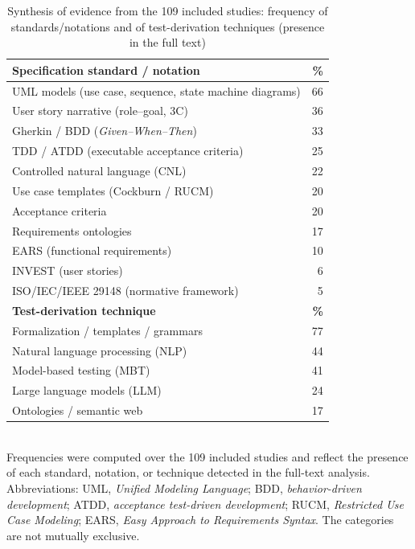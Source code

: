 \documentclass[10pt,journal,twoside,letterpaper]{IEEEtran}
\begin{document}
    \begin{table}[!tb]
        \caption{Synthesis of evidence from the 109 included studies: frequency of standards/notations and of test-derivation techniques (presence in the full text)}
        \label{tab:sintesis}
        \centering
        \small
        \setlength{\tabcolsep}{6pt}
        \begin{tabular}{@{}p{6.9cm}r@{}}
            \toprule
            \textbf{Specification standard / notation} & \textbf{\%} \\
            \midrule
            UML models (use case, sequence, state machine diagrams) & 66 \\
            User story narrative (role--goal, 3C) & 36 \\
            Gherkin / BDD (\emph{Given--When--Then}) & 33 \\
            TDD / ATDD (executable acceptance criteria) & 25 \\
            Controlled natural language (CNL) & 22 \\
            Use case templates (Cockburn / RUCM) & 20 \\
            Acceptance criteria & 20 \\
            Requirements ontologies & 17 \\
            EARS (functional requirements) & 10 \\
            INVEST (user stories) & 6 \\
            ISO/IEC/IEEE 29148 (normative framework) & 5 \\
            \midrule
            \textbf{Test-derivation technique} & \textbf{\%} \\
            \midrule
            Formalization / templates / grammars & 77 \\
            Natural language processing (NLP) & 44 \\
            Model-based testing (MBT) & 41 \\
            Large language models (LLM) & 24 \\
            Ontologies / semantic web & 17 \\
            \bottomrule
        \end{tabular}
        \\[3pt]
        {\footnotesize Frequencies were computed over the 109 included studies and reflect the presence of each standard, notation, or technique detected in the full-text analysis. Abbreviations: UML, \emph{Unified Modeling Language}; BDD, \emph{behavior-driven development}; ATDD, \emph{acceptance test-driven development}; RUCM, \emph{Restricted Use Case Modeling}; EARS, \emph{Easy Approach to Requirements Syntax}. The categories are not mutually exclusive.}
    \end{table}
    
\end{document}
